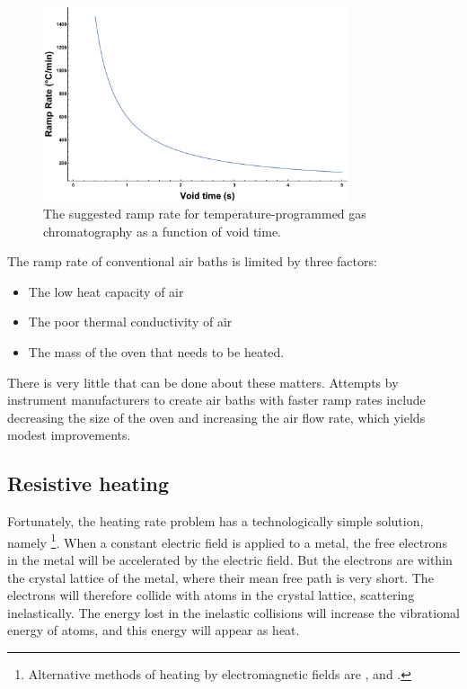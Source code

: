 \begin{figure}
	\centering
	\includegraphics[width=0.8\textwidth]{Figures/RampRate.pdf}
	\decoRule
	\caption[Suggested ramp rate]{The suggested ramp rate for temperature-programmed gas chromatography as a function of void time.}
	\label{fig:RampRateBlumberg}
\end{figure}

The ramp rate of conventional air baths is limited by three factors:

\begin{itemize}
	\item The low heat capacity of air
	\item The poor thermal conductivity of air
	\item The mass of the oven that needs to be heated. 
\end{itemize}

There is very little that can be done about these matters. Attempts by
instrument manufacturers to create air baths with faster ramp rates include
decreasing the size of the oven and increasing the air flow rate, which yields
modest improvements.

\subsection{Resistive heating}

Fortunately, the heating rate problem has a technologically simple solution,
namely \footnote{Alternative methods of heating by
electromagnetic fields are ,  and .}. When a constant electric field is
applied to a metal, the free electrons in the metal will be accelerated by the
electric field. But the electrons are within the crystal lattice of the metal,
where their mean free path is very short. The electrons will therefore collide
with atoms in the crystal lattice, scattering inelastically. The energy lost in
the inelastic collisions will increase the vibrational energy of atoms, and
this energy will appear as heat.


